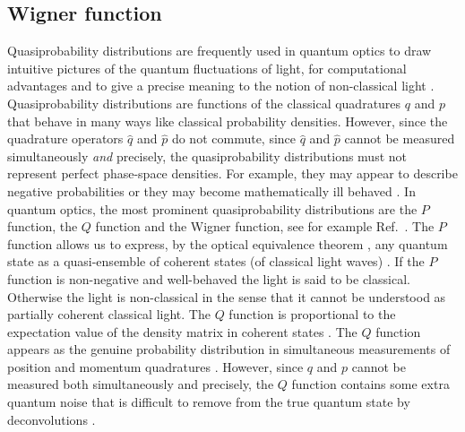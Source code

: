 \documentclass[12pt,amsmath,amssymb]{article}
\numberwithin{equation}{section}
\begin{document}
\subsection{Wigner function}

Quasiprobability distributions \cite{BK,Leonhardt,Schleich}
are frequently
used in quantum optics to draw intuitive pictures of the quantum
fluctuations of light, for computational advantages and to give a
precise meaning to the notion of non-classical light
\cite{Leonhardt}. Quasiprobability distributions are functions of
the classical quadratures $q$ and $p$ that behave in many ways
like classical probability densities. However, since the
quadrature operators $\hat{q}$ and $\hat{p}$ do not commute,
since $\hat{q}$ and $\hat{p}$ cannot be measured simultaneously
{\it and} precisely, the quasiprobability distributions must not
represent perfect phase-space densities. For example, they may
appear to describe negative probabilities or they may become
mathematically ill behaved \cite{Leonhardt}. In quantum optics,
the most prominent quasiprobability distributions are the $P$
function, the $Q$ function and the Wigner function,
see for example Ref.\ \cite{Leonhardt}.
The $P$ function allows us to express, by the
optical equivalence theorem \cite{Glauber,Leonhardt,Sudarshan},
any quantum state as a quasi-ensemble of coherent states (of
classical light waves) \cite{Leonhardt,Loudon,MandelWolf}. If the
$P$ function is non-negative and well-behaved the light is
said to be classical.
Otherwise the light is non-classical in the sense that
it cannot be understood as partially coherent classical light. The
$Q$ function is proportional to the expectation value of the
density matrix in coherent states \cite{Leonhardt}. The $Q$
function appears as the genuine probability distribution in
simultaneous measurements of position and momentum quadratures
\cite{Leonhardt,WalkerCarroll,Walker}. However, since $q$ and $p$
cannot be measured both simultaneously and precisely, the $Q$
function contains some extra quantum noise that is difficult to
remove from the true quantum state by deconvolutions
\cite{LPSim,Leonhardt}.
\end{document}
